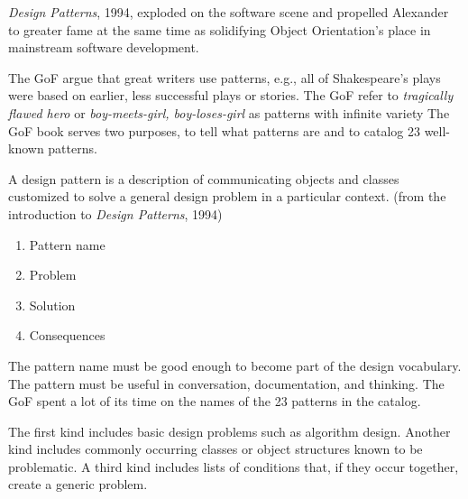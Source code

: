 \hypertarget{gang-of-four-book}{%
\label{gang-of-four-book}}

\emph{Design Patterns}, 1994, exploded on the software scene and
propelled Alexander to greater fame at the same time as solidifying
Object Orientation's place in mainstream software development.

The GoF argue that great writers use patterns, e.g., all of
Shakespeare's plays were based on earlier, less successful plays or
stories. The GoF refer to \emph{tragically flawed hero} or
\emph{boy-meets-girl, boy-loses-girl} as patterns with infinite variety
The GoF book serves two purposes, to tell what patterns are and to
catalog 23 well-known patterns.

\hypertarget{gang-of-four-pattern-definition}{%
\label{gang-of-four-pattern-definition}}

A design pattern is a description of communicating objects and classes
customized to solve a general design problem in a particular context.
(from the introduction to \emph{Design Patterns}, 1994)

\hypertarget{a-pattern-has-four-things}{%
\label{a-pattern-has-four-things}}

\begin{enumerate}
\def\labelenumi{\arabic{enumi}.}
\tightlist
\item
  Pattern name
\item
  Problem
\item
  Solution
\item
  Consequences
\end{enumerate}

\hypertarget{a-pattern-name-is-a-tool}{%
\label{a-pattern-name-is-a-tool}}

The pattern name must be good enough to become part of the design
vocabulary. The pattern must be useful in conversation, documentation,
and thinking. The GoF spent a lot of its time on the names of the 23
patterns in the catalog.

\hypertarget{a-problem-may-be-of-several-kinds}{%
\label{a-problem-may-be-of-several-kinds}}

The first kind includes basic design problems such as algorithm design.
Another kind includes commonly occurring classes or object structures
known to be problematic. A third kind includes lists of conditions that,
if they occur together, create a generic problem.

